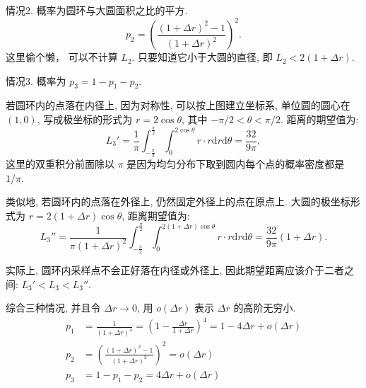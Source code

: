 情况2. 概率为圆环与大圆面积之比的平方.
\[p_2 = \left( \frac{(1+\Delta r)^2 - 1}{(1+\Delta r)^2} \right)^2 .\]
这里偷个懒， 可以不计算 $L_2$. 只要知道它小于大圆的直径, 即 $L_2 < 2(1+\Delta r)$.

情况3. 概率为 $ p_3 = 1 - p_1 - p_2 $. 

\begin{figure}[htbp]
\centering
{}
\end{figure}
\noindent 若圆环内的点落在内径上, 因为对称性, 可以按上图建立坐标系, 单位圆的圆心在 $(1,0)$, 写成极坐标的形式为 $r = 2\cos\theta $, 其中 $-\pi/2 < \theta < \pi/2$.
距离的期望值为:
\[ L_3'= \frac{1}{\pi}\int_{-\frac{\pi}{2}}^{\frac{\pi}{2}}\int_0^{2\cos\theta} r\cdot r\mathrm{d}r \mathrm{d}\theta = \frac{32}{9\pi},\]
这里的双重积分前面除以 $\pi$ 是因为均匀分布下取到圆内每个点的概率密度都是 $1/\pi$. 

类似地, 若圆环内的点落在外径上, 仍然固定外径上的点在原点上. 大圆的极坐标形式为 $ r = 2(1+\Delta r)\cos\theta$, 距离期望值为:
\[ L_3'' = \frac{1}{\pi(1+\Delta r)^2}\int_{-\frac{\pi}{2}}^{\frac{\pi}{2}}\int_0^{2(1+\Delta r)\cos\theta} r\cdot r\mathrm{d}r \mathrm{d}\theta = \frac{32}{9\pi}(1+\Delta r).\]

实际上, 圆环内采样点不会正好落在内径或外径上, 因此期望距离应该介于二者之间: $ L_3' < L_3 < L_3''$.

综合三种情况, 并且令 $\Delta r \rightarrow 0$, 用 $o(\Delta r)$ 表示 $\Delta r$ 的高阶无穷小.
\begin{align*}
p_1 &= \frac{1}{(1+\Delta r)^4} = \left(1-\frac{\Delta r}{1+\Delta r}\right)^4 = 1 - 4\Delta r + o(\Delta r) \\
p_2 &= \left( \frac{(1+\Delta r)^2 - 1}{(1+\Delta r)^2} \right)^2 = o(\Delta r) \\
p_3 &= 1 - p_1 - p_2 = 4\Delta r + o(\Delta r)
\end{align*}

